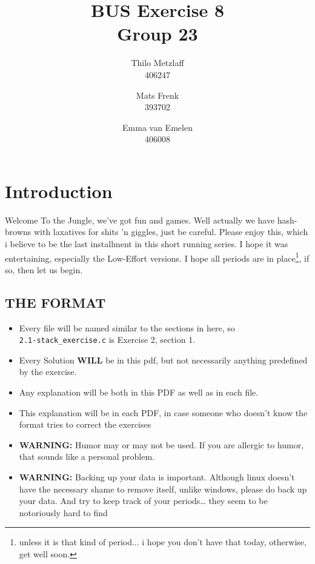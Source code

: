 \documentclass[a4paper, 11pt]{article}
\author{Thilo Metzlaff\\406247 \and Mats Frenk\\393702\and Emma van Emelen\\406008}
\title{BUS Exercise 8 \\ Group 23}
\begin{document}
    \maketitle
    \newpage

    \tableofcontents
    \newpage

    \section*{Introduction}
    Welcome To the Jungle, we've got fun and games. Well actually we have hash-browns with laxatives for shits 'n giggles, just be careful.
    Please enjoy this, which i believe to be the last installment in this short running series. I hope it was entertaining, especially the Low-Effort versions.
    I hope all periods are in place\footnote{unless it is that kind of period... i hope you don't have that today, otherwise, get well soon.}, if so, then let us begin. 
    

    \subsection*{THE FORMAT}
    \begin{itemize}
      \item Every file will be named similar to the sections in here, so\\
      \texttt{2.1-stack\_exercise.c} is Exercise 2, section 1.
      \item Every Solution \textbf{WILL} be in this pdf, but not necessarily 
            anything predefined by the exercise.
      \item Any explanation will be both in this PDF as well as in each file.
      \item This explanation will be in each PDF, in case someone who doesn't
            know the format tries to correct the exercises
      \item \textbf{WARNING:} Humor may or may not be used. If you are allergic
            to humor, that sounds like a personal problem.
      \item \textbf{WARNING:} Backing up your data is important. Although linux 
            doesn't have the necessary shame to remove itself, unlike windows,
            please do back up your data. And try to keep track of your periods\dots
            they seem to be notoriously hard to find
    \end{itemize}
    \newpage
\end{document}
